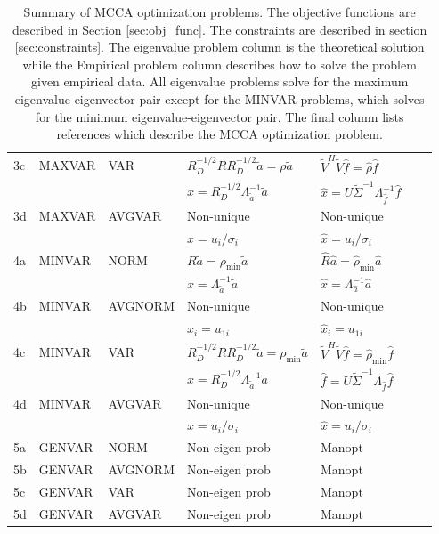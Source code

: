 \begin{table}[!h]
\begin{tabular}{lllllll}
    3c & MAXVAR & VAR &
    $R_D^{-1/2}RR_D^{-1/2}\tilde{a}=\rho\tilde{a}$&
    $\tilde{V}^H\tilde{V}\widehat{f}=\widehat{\rho}\widehat{f}$&
    \cite{kettenring1971canonical,nielsen1994analysis}\\ 
    &&&$x=R_D^{-1/2}\Lambda_{\widetilde{a}}^{-1}\widetilde{a}$&
    $\widehat{x}=U\widetilde{\Sigma}^{-1}\Lambda_{\widehat{f}}^{-1}\widehat{f}$&\\ 
    3d & MAXVAR & AVGVAR &
    Non-unique &
    Non-unique &
    \cite{deleus2011functional,via2005canonical,nielsen1994analysis}\\ 
    &&& $x=u_i/\sigma_i$ & $\widehat{x} = u_i/\sigma_i$&\\  
    \midrule
    4a & MINVAR & NORM & $R\tilde{a} = \rho_{\text{min}}\tilde{a}$ &
    $\widehat{R}\widehat{a}=\widehat{\rho}_{\text{min}}\widehat{a}$&  
    \cite{nielsen1994analysis}\\ 
    &&&$x=\Lambda_{\widetilde{a}}^{-1}\widetilde{a}$&
    $\widehat{x}=\Lambda_{\widehat{a}}^{-1}\widehat{a}$ &\\  
    4b & MINVAR & AVGNORM & Non-unique & Non-unique & 
    \cite{nielsen1994analysis}\\ 
    &&& $x_i = u_{1i}$ & $\widehat{x}_i = u_{1i}$&\\
    4c & MINVAR & VAR &
    $R_D^{-1/2}RR_D^{-1/2}\widetilde{a}=\rho_{\text{min}}\widetilde{a}$&
    $\widetilde{V}^H\widetilde{V}\widehat{f}=\widehat{\rho}_{\text{min}} \widehat{f}$&
    \cite{kettenring1971canonical,nielsen1994analysis}\\ 
    &&&$x=R_D^{-1/2}\Lambda_{\widetilde{a}}^{-1}\widetilde{a}$&
    $\widehat{f}=U\widetilde{\Sigma}^{-1}\Lambda_{\widehat{f}}\widehat{f}$& \\
    4d & MINVAR & AVGVAR & Non-unique & Non-unique&
    \cite{nielsen1994analysis,bach2003kernel}\\ 
    &&& $x=u_{i}/\sigma_i$ & $\widehat{x} = u_i/\sigma_i $&\\  
    \midrule
    5a & GENVAR & NORM & Non-eigen prob & Manopt&  \cite{nielsen1994analysis}\\
    5b & GENVAR & AVGNORM & Non-eigen prob & Manopt&  \cite{nielsen1994analysis}\\
    5c & GENVAR & VAR &Non-eigen prob & Manopt&
    \cite{kettenring1971canonical,nielsen1994analysis}\\  
    5d & GENVAR & AVGVAR & Non-eigen prob & Manopt &  \cite{nielsen1994analysis}\\
    \bottomrule
  \end{tabular}
  \caption{Summary of MCCA optimization problems. The objective functions are described in
    Section \ref{sec:obj_func}. The constraints are described in section
    \ref{sec:constraints}. The eigenvalue problem column is the theoretical solution while
    the Empirical problem column describes how to solve the problem given empirical
    data. All eigenvalue problems solve for the maximum eigenvalue-eigenvector pair
    except for the MINVAR problems, which solves for the minimum eigenvalue-eigenvector
    pair. The final column lists references which describe the MCCA optimization
    problem. }\vskip-0.2cm 
  \label{tab:main_results}
\end{table}


